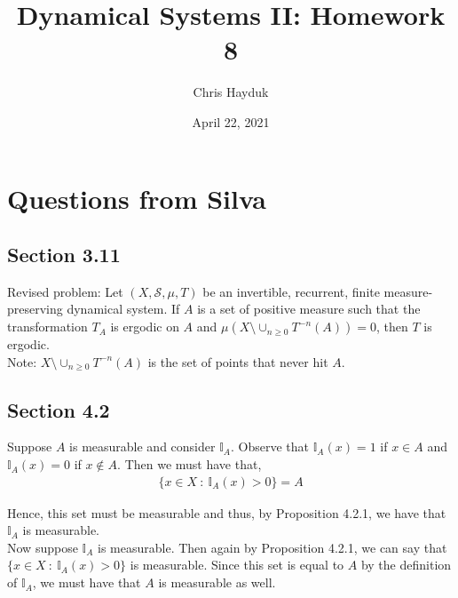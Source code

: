 \documentclass[12pt]{article}
\newenvironment{problem}[2][Problem]{\begin{trivlist}
\item[\hskip \labelsep {\bfseries #1}\hskip \labelsep {\bfseries #2.}]}{\end{trivlist}}
\begin{document}
\title{Dynamical Systems II: Homework 8}

\author{Chris Hayduk}
\date{April 22, 2021}

\maketitle

\section{Questions from Silva}

\subsection{Section 3.11}

\begin{problem}{3}
Revised problem: Let $(X, \mathcal{S}, \mu, T)$ be an invertible, recurrent, finite measure-preserving dynamical system. If $A$ is a set of positive measure such that the transformation $T_A$ is ergodic on $A$ and $\mu(X \setminus \cup_{n \geq 0} T^{-n}(A)) = 0$, then $T$ is ergodic.\\

Note: $X \setminus \cup_{n \geq 0} T^{-n}(A)$ is the set of points that never hit $A$.
\end{problem}


\subsection{Section 4.2}

\begin{problem}{3}
\end{problem}

Suppose $A$ is measurable and consider $\mathbb{I}_A$. Observe that $\mathbb{I}_A(x) = 1$ if $x \in A$ and $\mathbb{I}_A(x) = 0$ if $x \not\in A$. Then we must have that,
\begin{align*}
\{x \in X \ : \ \mathbb{I}_A(x) > 0\} = A
\end{align*}

Hence, this set must be measurable and thus, by Proposition 4.2.1, we have that $\mathbb{I}_A$ is measurable.\\

Now suppose $\mathbb{I}_A$ is measurable. Then again by Proposition 4.2.1, we can say that $\{x \in X \ : \ \mathbb{I}_A(x) > 0\}$ is measurable. Since this set is equal to $A$ by the definition of $\mathbb{I}_A$, we must have that $A$ is measurable as well.
\end{document}
